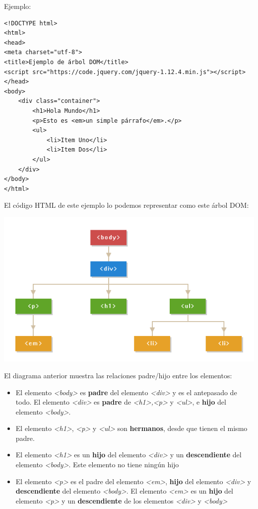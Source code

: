 \documentclass[11pt]{article}
\begin{document}
Ejemplo:

\begin{verbatim}
<!DOCTYPE html>
<html>
<head>
<meta charset="utf-8">
<title>Ejemplo de árbol DOM</title>
<script src="https://code.jquery.com/jquery-1.12.4.min.js"></script>
</head>
<body>
    <div class="container">
        <h1>Hola Mundo</h1>
        <p>Esto es <em>un simple párrafo</em>.</p>
        <ul>
            <li>Item Uno</li>
            <li>Item Dos</li>
        </ul>
    </div>
</body>
</html>                                		
\end{verbatim}


El código HTML de este ejemplo lo podemos representar como este árbol DOM:


\begin{center}
\includegraphics[width=.9\linewidth]{./img/arbol-dom.png}
\end{center}


El diagrama anterior muestra las relaciones padre/hijo entre los elementos:

\begin{itemize}
\item El elemento \emph{<body>} es \textbf{padre} del elemento \emph{<div>} y es el antepasado de todo. El elemento \emph{<div>} es \textbf{padre} de \emph{<h1>,<p>} y \emph{<ul>}, e \textbf{hijo} del elemento \emph{<body>}.
\item El elemento \emph{<h1>}, \emph{<p>} y \emph{<ul>} son \textbf{hermanos}, desde que tienen el mismo padre.
\item El elemento \emph{<h1>} es un \textbf{hijo} del elemento \emph{<div>} y un \textbf{descendiente} del elemento \emph{<body>}. Este elemento no tiene ningún hijo
\item El elemento \emph{<p>} es el padre del elemento \emph{<em>}, \textbf{hijo} del elemento \emph{<div>} y \textbf{descendiente} del elemento \emph{<body>}. El elemento \emph{<em>} es un \textbf{hijo} del elemento \emph{<p>} y un \textbf{descendiente} de los elementos \emph{<div>} y \emph{<body>}
\end{itemize}
\end{document}
